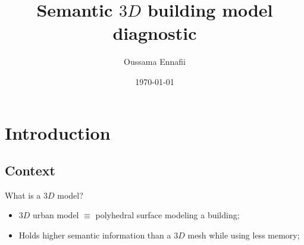 \documentclass{beamer}
\title{Semantic $3D$ building model diagnostic}
\subtitle{}
\institute[LaSTIG MATIS]{Univ. Paris Est, LaSTIG MATIS, IGN, ENSG}
\date{\today}
\author[O.Ennafii]{Oussama Ennafii}
\begin{document}
    \begin{frame}[plain]
        \titlepage{}
    \end{frame}

    \section{Introduction}
        \subsection{Context}
            \begin{frame}{What is a $3D$ model?}
                \begin{itemize}[label=$\blacktriangleright$, font=\color{IGNGreen}]
                    \item<1-> $3D$ urban model $\equiv$ polyhedral surface modeling a building;
                    \item<2-> Holds higher semantic information than a $3D$ mesh while using less memory;
                \end{itemize}
            \end{frame}
\end{document}

